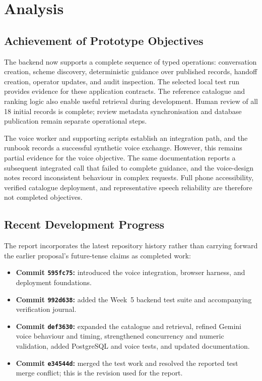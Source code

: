 \documentclass[11pt,a4paper,oneside]{report}
\newcommand{\Revision}{e34544d}
\begin{document}
\clearpage
\section{Analysis}

\subsection{Achievement of Prototype Objectives}
The backend now supports a complete sequence of typed operations: conversation
creation, scheme discovery, deterministic guidance over published records,
handoff creation, operator updates, and audit inspection. The selected local test
run provides evidence for these application contracts. The reference catalogue
and ranking logic also enable useful retrieval during development. Human review
of all 18 initial records is complete; review metadata synchronisation and
database publication remain separate operational steps.

The voice worker and supporting scripts establish an integration path, and the
runbook records a successful synthetic voice exchange. However, this remains
partial evidence for the voice objective. The same documentation reports a
subsequent integrated call that failed to complete guidance, and the voice-design
notes record inconsistent behaviour in complex requests. Full phone accessibility,
verified catalogue deployment, and representative speech reliability are therefore
not completed objectives.

\subsection{Recent Development Progress}
The report incorporates the latest repository history rather than carrying
forward the earlier proposal's future-tense claims as completed work:
\begin{itemize}
  \item \textbf{Commit \texttt{595fc75}:} introduced the voice integration,
    browser harness, and deployment foundations.
  \item \textbf{Commit \texttt{992d638}:} added the Week~5 backend test suite and
    accompanying verification journal.
  \item \textbf{Commit \texttt{def3630}:} expanded the catalogue and retrieval,
    refined Gemini voice behaviour and timing, strengthened concurrency and
    numeric validation, added PostgreSQL and voice tests, and updated documentation.
  \item \textbf{Commit \texttt{\Revision}:} merged the test work and resolved the
    reported test merge conflict; this is the revision used for the report.
\end{itemize}
\end{document}
